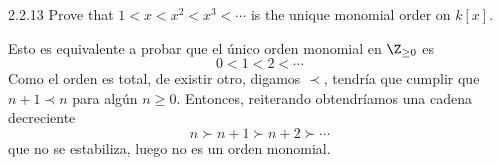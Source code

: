 \documentclass[twoside]{article}
\begin{document}
\newpage

\begin{ejercicio}{2.2.13}
Prove that $1 < x < x^2 < x^3 <\cdots$ is the unique monomial order on $k[x]$.
\end{ejercicio}
\begin{solucion}
Esto es equivalente a probar que el único orden monomial en $\Z_{\geq 0}$ es
\[
0<1<2<\cdots
\] 
Como el orden es total, de existir otro, digamos $\prec$,  tendría que cumplir que $n+1\prec n$ para algún $n\geq 0$. Entonces, reiterando obtendríamos una cadena decreciente 
\[
n\succ n+1\succ n+2\succ\cdots 
\]
que no se estabiliza, luego no es un orden monomial.
\end{solucion}
\end{document}
